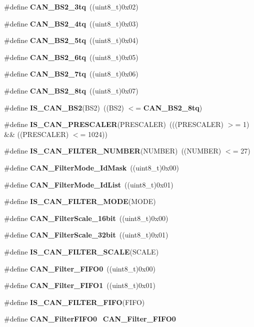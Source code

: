 \begin{DoxyCompactItemize}
\item 
\#define \textbf{ C\+A\+N\+\_\+\+B\+S2\+\_\+3tq}~((uint8\+\_\+t)0x02)
\item 
\#define \textbf{ C\+A\+N\+\_\+\+B\+S2\+\_\+4tq}~((uint8\+\_\+t)0x03)
\item 
\#define \textbf{ C\+A\+N\+\_\+\+B\+S2\+\_\+5tq}~((uint8\+\_\+t)0x04)
\item 
\#define \textbf{ C\+A\+N\+\_\+\+B\+S2\+\_\+6tq}~((uint8\+\_\+t)0x05)
\item 
\#define \textbf{ C\+A\+N\+\_\+\+B\+S2\+\_\+7tq}~((uint8\+\_\+t)0x06)
\item 
\#define \textbf{ C\+A\+N\+\_\+\+B\+S2\+\_\+8tq}~((uint8\+\_\+t)0x07)
\item 
\#define \textbf{ I\+S\+\_\+\+C\+A\+N\+\_\+\+B\+S2}(B\+S2)~((B\+S2) $<$= \textbf{ C\+A\+N\+\_\+\+B\+S2\+\_\+8tq})
\item 
\#define \textbf{ I\+S\+\_\+\+C\+A\+N\+\_\+\+P\+R\+E\+S\+C\+A\+L\+ER}(P\+R\+E\+S\+C\+A\+L\+ER)~(((P\+R\+E\+S\+C\+A\+L\+ER) $>$= 1) \&\& ((P\+R\+E\+S\+C\+A\+L\+ER) $<$= 1024))
\item 
\#define \textbf{ I\+S\+\_\+\+C\+A\+N\+\_\+\+F\+I\+L\+T\+E\+R\+\_\+\+N\+U\+M\+B\+ER}(N\+U\+M\+B\+ER)~((N\+U\+M\+B\+ER) $<$= 27)
\item 
\#define \textbf{ C\+A\+N\+\_\+\+Filter\+Mode\+\_\+\+Id\+Mask}~((uint8\+\_\+t)0x00)
\item 
\#define \textbf{ C\+A\+N\+\_\+\+Filter\+Mode\+\_\+\+Id\+List}~((uint8\+\_\+t)0x01)
\item 
\#define \textbf{ I\+S\+\_\+\+C\+A\+N\+\_\+\+F\+I\+L\+T\+E\+R\+\_\+\+M\+O\+DE}(M\+O\+DE)
\item 
\#define \textbf{ C\+A\+N\+\_\+\+Filter\+Scale\+\_\+16bit}~((uint8\+\_\+t)0x00)
\item 
\#define \textbf{ C\+A\+N\+\_\+\+Filter\+Scale\+\_\+32bit}~((uint8\+\_\+t)0x01)
\item 
\#define \textbf{ I\+S\+\_\+\+C\+A\+N\+\_\+\+F\+I\+L\+T\+E\+R\+\_\+\+S\+C\+A\+LE}(S\+C\+A\+LE)
\item 
\#define \textbf{ C\+A\+N\+\_\+\+Filter\+\_\+\+F\+I\+F\+O0}~((uint8\+\_\+t)0x00)
\item 
\#define \textbf{ C\+A\+N\+\_\+\+Filter\+\_\+\+F\+I\+F\+O1}~((uint8\+\_\+t)0x01)
\item 
\#define \textbf{ I\+S\+\_\+\+C\+A\+N\+\_\+\+F\+I\+L\+T\+E\+R\+\_\+\+F\+I\+FO}(F\+I\+FO)
\item 
\#define \textbf{ C\+A\+N\+\_\+\+Filter\+F\+I\+F\+O0}~\textbf{ C\+A\+N\+\_\+\+Filter\+\_\+\+F\+I\+F\+O0}
\item 

\end{DoxyCompactItemize}
